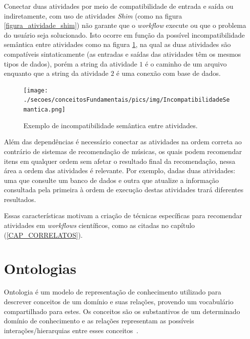 Conectar duas atividades por meio de compatibilidade de entrada e saída ou indiretamente, com uso de atividades \emph{Shim} (como na figura \ref{figura_atividade_shim}) não garante que o \emph{workflow} execute ou que o problema do usuário seja solucionado. Isto ocorre em função da possível incompatibilidade semântica entre atividades como na figura \ref{figura_Incompatibilidade_Semantica}, 
na qual as duas atividades são compatíveis sintaticamente (as entradas e saídas das atividades têm os mesmos tipos de dados), porém a string da atividade \(1\) é o caminho de um arquivo enquanto que a string da atividade \(2\) é uma conexão com base de dados.
\begin{figure}[!hbt]
    \centering  
    \caption{Exemplo de incompatibilidade semântica entre atividades.}
    \texttt{[image: ./secoes/conceitosFundamentais/pics/img/IncompatibilidadeSemantica.png]}    
	\label{figura_Incompatibilidade_Semantica}
\end{figure}

Além das dependências é necessário conectar as atividades na ordem correta ao contrário de sistemas de recomendação de músicas, os quais podem recomendar itens em qualquer ordem sem afetar o resultado final da recomendação, nessa área a ordem das atividades é relevante. Por exemplo, dadas duas atividades: uma que consulte um banco de dados e outra que atualize a informação consultada pela primeira à ordem de execução destas atividades trará diferentes resultados.

Essas características motivam a criação de técnicas específicas para recomendar atividades em \emph{workflows} científicos, como as citadas no capítulo (\ref{CAP_CORRELATOS}).


\section{Ontologias}\label{SEC_ONTOLOGIA}
Ontologia é um modelo de representação de conhecimento utilizado para descrever conceitos de um domínio e suas relações, provendo um vocabulário compartilhado para estes. Os conceitos são os substantivos de um determinado domínio de conhecimento e as relações representam as possíveis interações/hierarquias entre esses conceitos~\cite{Umamaheswari2012}.

